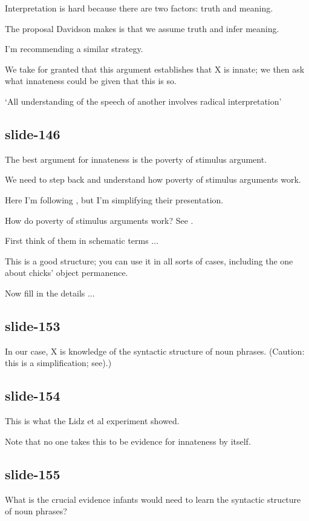\documentclass[12pt,\papersize]{extarticle}
\begin{document}
Interpretation is hard because there are two factors: truth and meaning.

The proposal Davidson makes is that we assume truth and infer meaning.

I'm recommending a similar strategy.

We take for granted that this argument establishes that X is innate; we then ask what innateness could be given that this is so.

‘All understanding of the speech of another involves radical interpretation’
\citep[p.\ 125]{Davidson:1973jx}

\subsection{slide-146}
The best argument for innateness is the poverty of stimulus argument.

We need to step back and understand how poverty of stimulus arguments work.

Here I'm following \citet{pullum:2002_empirical}, but I'm simplifying their presentation.

How do poverty of stimulus arguments work? See \citet{pullum:2002_empirical}.

First think of them in schematic terms ...

This is a good structure; you can use it in all sorts of cases, including the one about chicks' object permanence.

Now fill in the details ...

\subsection{slide-153}
In our case, X is knowledge of the syntactic structure of noun phrases.  (Caution: this is a simplification; see\citet[p,\ 158]{lidz:2004_reaffirming}).)

\subsection{slide-154}
This is what the Lidz et al experiment showed.

Note that no one takes this to be evidence for innateness by itself.

\subsection{slide-155}
What is the crucial evidence infants would need to learn the syntactic structure of noun phrases?
\end{document}
